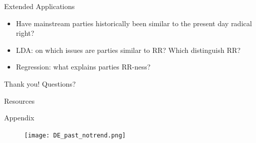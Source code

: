\documentclass{beamer}
\begin{document}
\begin{frame}{Extended Applications}
    \begin{itemize}
        \item Have mainstream parties historically been similar to the present day radical right?
        \item LDA: on which issues are parties similar to RR? Which distinguish RR?
        \item Regression: what explains parties RR-ness?
    \end{itemize}
\end{frame}

\begin{frame}{Thank you!}
    \huge \centering
    Questions?
\end{frame}



\begin{frame}[allowframebreaks]{Resources}
     \printbibliography
\end{frame}

\begin{frame}[allowframebreaks]{Appendix}
    \begin{figure}
        \centering
        \texttt{[image: DE\_past\_notrend.png]}
    \end{figure}
\end{frame}
\end{document}
